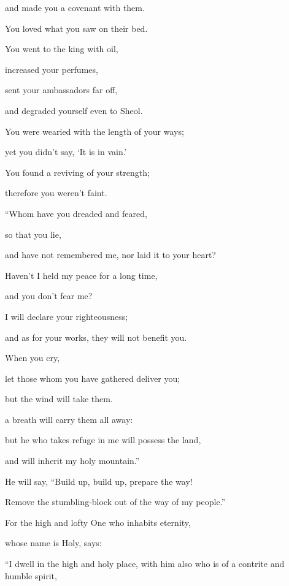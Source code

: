 {\par }{\QB and made you a covenant with them.
\par }{\QB You loved what you saw on their bed.
\par }{\Q {}You went to the king with oil,
\par }{\QB increased your perfumes,
\par }{\QB sent your ambassadors far off,
\par }{\QB and degraded yourself even to Sheol.
\par }{\Q {}You were wearied with the length of your ways;
\par }{\QB yet you didn’t say, ‘It is in vain.’
\par }{\Q You found a reviving of your strength;
\par }{\QB therefore you weren’t faint.
\par }{\BB \par }{\Q {}“Whom have you dreaded and feared,
\par }{\QB so that you lie,
\par }{\QB and have not remembered me, nor laid it to your heart?
\par }{\Q Haven’t I held my peace for a long time,
\par }{\QB and you don’t fear me?
\par }{\Q {}I will declare your righteousness;
\par }{\QB and as for your works, they will not benefit you.
\par }{\Q {}When you cry,
\par }{\QB let those whom you have gathered deliver you;
\par }{\Q but the wind will take them.
\par }{\QB a breath will carry them all away:
\par }{\Q but he who takes refuge in me will possess the land,
\par }{\QB and will inherit my holy mountain.”
\par }{\BB \par }{\Q {}He will say, “Build up, build up, prepare the way!
\par }{\QB Remove the stumbling-block out of the way of my people.”
\par }{\Q {}For the high and lofty One who inhabits eternity,
\par }{\QB whose name is Holy, says:
\par }{\Q “I dwell in the high and holy place, with him also who is of a contrite and humble spirit,
}
